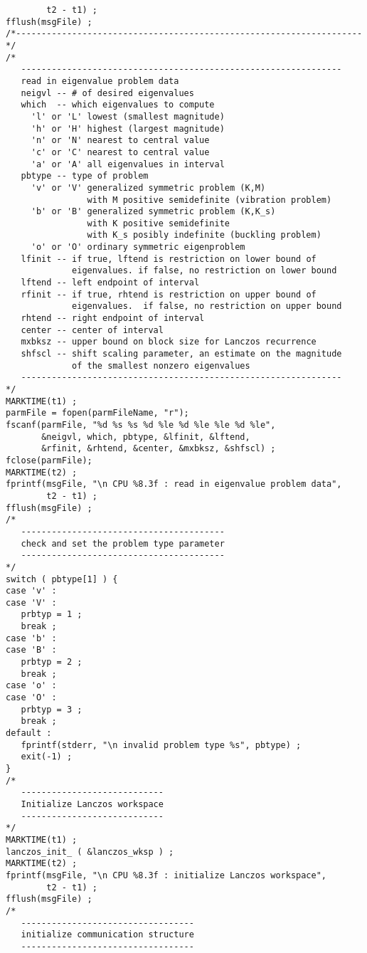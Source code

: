 \begin{verbatim}
        t2 - t1) ;
fflush(msgFile) ;
/*--------------------------------------------------------------------*/
/*
   ---------------------------------------------------------------
   read in eigenvalue problem data
   neigvl -- # of desired eigenvalues
   which  -- which eigenvalues to compute
     'l' or 'L' lowest (smallest magnitude)
     'h' or 'H' highest (largest magnitude)
     'n' or 'N' nearest to central value
     'c' or 'C' nearest to central value
     'a' or 'A' all eigenvalues in interval
   pbtype -- type of problem
     'v' or 'V' generalized symmetric problem (K,M)
                with M positive semidefinite (vibration problem)
     'b' or 'B' generalized symmetric problem (K,K_s)
                with K positive semidefinite
                with K_s posibly indefinite (buckling problem)
     'o' or 'O' ordinary symmetric eigenproblem
   lfinit -- if true, lftend is restriction on lower bound of
             eigenvalues. if false, no restriction on lower bound
   lftend -- left endpoint of interval
   rfinit -- if true, rhtend is restriction on upper bound of
             eigenvalues.  if false, no restriction on upper bound
   rhtend -- right endpoint of interval
   center -- center of interval
   mxbksz -- upper bound on block size for Lanczos recurrence
   shfscl -- shift scaling parameter, an estimate on the magnitude
             of the smallest nonzero eigenvalues
   ---------------------------------------------------------------
*/
MARKTIME(t1) ;
parmFile = fopen(parmFileName, "r");
fscanf(parmFile, "%d %s %s %d %le %d %le %le %d %le",
       &neigvl, which, pbtype, &lfinit, &lftend,
       &rfinit, &rhtend, &center, &mxbksz, &shfscl) ;
fclose(parmFile);
MARKTIME(t2) ;
fprintf(msgFile, "\n CPU %8.3f : read in eigenvalue problem data",
        t2 - t1) ;
fflush(msgFile) ;
/*
   ----------------------------------------
   check and set the problem type parameter
   ----------------------------------------
*/
switch ( pbtype[1] ) {
case 'v' :
case 'V' :
   prbtyp = 1 ;
   break ;
case 'b' :
case 'B' :
   prbtyp = 2 ;
   break ;
case 'o' :
case 'O' :
   prbtyp = 3 ;
   break ;
default :
   fprintf(stderr, "\n invalid problem type %s", pbtype) ;
   exit(-1) ;
}
/*
   ----------------------------
   Initialize Lanczos workspace
   ----------------------------
*/
MARKTIME(t1) ;
lanczos_init_ ( &lanczos_wksp ) ;
MARKTIME(t2) ;
fprintf(msgFile, "\n CPU %8.3f : initialize Lanczos workspace",
        t2 - t1) ;
fflush(msgFile) ;
/*
   ----------------------------------
   initialize communication structure
   ----------------------------------

\end{verbatim}
